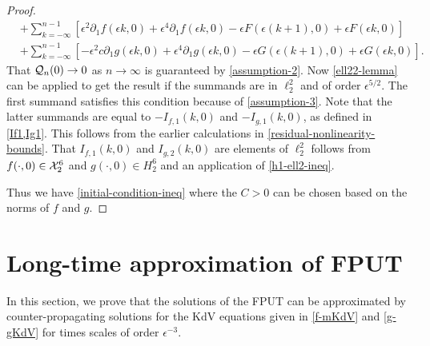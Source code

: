 \begin{proof}
\begin{equation*}
\begin{aligned}
		&+\sum_{k=-\infty}^{n-1}\left[  \epsilon^2 \partial_1 f(\epsilon k,0) +\epsilon^4 \partial_1 f(\epsilon k,0) - \epsilon F(\epsilon(k+1),0) +\epsilon F(\epsilon k ,0)  \right] \\
		&+ \sum_{k=-\infty}^{n-1}\left[ - \epsilon^2 c\partial_1 g(\epsilon k,0) +\epsilon^4 \partial_1 g(\epsilon k,0) - \epsilon G(\epsilon(k+1),0) +\epsilon G(\epsilon k ,0)  \right].
	\end{aligned}
	\end{equation*}
	That \(\mathcal{Q}_n(0)\to 0\) as \(n\to\infty\) is guaranteed by \cref{assumption-2}. Now \cref{ell22-lemma} can be applied to get the result if the summands are in \(\ell^2_2\) and of order \(\epsilon^{5/2}\). The first summand satisfies this condition because of \cref{assumption-3}.  Note that the latter summands are equal to \(-I_{f,1}(k,0)\) and \(-I_{g,1}(k,0)\), as defined in \cref{If1,Ig1}. This follows from the earlier calculations in \cref{residual-nonlinearity-bounds}. That \(I_{f,1}(k,0)\) and \(I_{g,2}(k,0)\) are elements of \(\ell^2_2\) follows from \(f(\cdot, 0) \in \mathcal{X}^6_2\) and \(g(\cdot, 0) \in H^6_2\) and an application of \cref{h1-ell2-ineq}.
	
	Thus we have \cref{initial-condition-ineq} where the \(C>0\) can be chosen based on the norms of \(f\) and \(g\).
\end{proof}

\section{Long-time approximation of FPUT}

In this section, we prove that the solutions of the FPUT can be approximated by counter-propagating solutions for the KdV equations given in \cref{f-mKdV} and \cref{g-gKdV} for times scales of order \(\epsilon^{-3}\).

